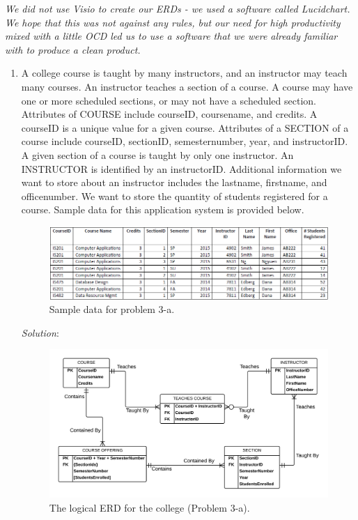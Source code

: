 \documentclass{article}
\begin{document}
\begin{enumerate}
	\textit{We did not use Visio to create our ERDs - we used a software called Lucidchart. We hope that this was not against any rules, but our need for high productivity mixed with a little OCD led us to use a software that we were already familiar with to produce a clean product.}\\

	\newpage
	\begin{enumerate}
		\item A college course is taught by many instructors, and an instructor may teach many courses. An instructor teaches a section of a course. A course may have one or more scheduled sections, or may not have a scheduled section. Attributes of COURSE include courseID, coursename, and credits. A courseID is a unique value for a given course. Attributes of a SECTION of a course include courseID, sectionID, semesternumber, year, and instructorID. A given section of a course is taught by only one instructor. An INSTRUCTOR is identified by an instructorID. Additional information we want to store about an instructor includes the lastname, firstname, and officenumber. We want to store the quantity of students registered for a course. Sample data for this application system is provided below.\\

  \begin{figure}[h!]
    \centering
    \includegraphics[width=.7\linewidth]{HW01_Part03_TableA}
    \caption{Sample data for problem 3-a.}
    \label{fig:03_a_sample_data}
  \end{figure}
  
  \textit{Solution}:
  \begin{figure}[h!]
    \centering
    \includegraphics[width=.8\linewidth]{HW01_Part03_a-ERD}
    \caption{The logical ERD for the college (Problem 3-a).}
    \label{fig:03_a_solution}
  \end{figure}


\end{enumerate}
\end{enumerate}
\end{document}

